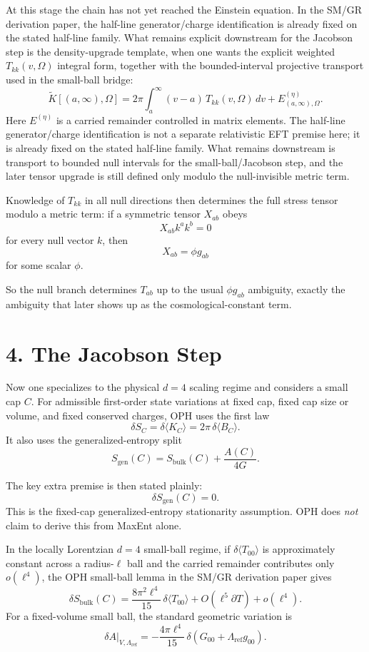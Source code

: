 \documentclass[10pt]{article}
\begin{document}
At this stage the chain has not yet reached the Einstein equation. In the SM/GR derivation paper, the half-line generator/charge identification is already fixed on the stated half-line family. What remains explicit downstream for the Jacobson step is the density-upgrade template, when one wants the explicit weighted \(T_{kk}(v,\Omega)\) integral form, together with the bounded-interval projective transport used in the small-ball bridge:
\[
\widetilde K[(a,\infty),\Omega]
=
2\pi\int_a^\infty (v-a)\,T_{kk}(v,\Omega)\,dv
+
E^{(\eta)}_{(a,\infty),\Omega}.
\]
Here \(E^{(\eta)}\) is a carried remainder controlled in matrix elements. The half-line generator/charge identification is not a separate relativistic EFT premise here; it is already fixed on the stated half-line family. What remains downstream is transport to bounded null intervals for the small-ball/Jacobson step, and the later tensor upgrade is still defined only modulo the null-invisible metric term.

Knowledge of \(T_{kk}\) in all null directions then determines the full stress tensor modulo a metric term: if a symmetric tensor \(X_{ab}\) obeys
\[
X_{ab} k^a k^b = 0
\]
for every null vector \(k\), then
\[
X_{ab} = \phi g_{ab}
\]
for some scalar \(\phi\).

So the null branch determines \(T_{ab}\) up to the usual \(\phi g_{ab}\) ambiguity, exactly the ambiguity that later shows up as the cosmological-constant term.

\section*{4. The Jacobson Step}

Now one specializes to the physical \(d=4\) scaling regime and considers a small cap \(C\). For admissible first-order state variations at fixed cap, fixed cap size or volume, and fixed conserved charges, OPH uses the first law
\[
\delta S_C = \delta \langle K_C\rangle = 2\pi\,\delta\langle B_C\rangle.
\]
It also uses the generalized-entropy split
\[
S_{\mathrm{gen}}(C)=S_{\mathrm{bulk}}(C)+\frac{A(C)}{4G}.
\]

The key extra premise is then stated plainly:
\[
\delta S_{\mathrm{gen}}(C)=0.
\]
This is the fixed-cap generalized-entropy stationarity assumption. OPH does \emph{not} claim to derive this from MaxEnt alone.

In the locally Lorentzian \(d=4\) small-ball regime, if \(\delta\langle T_{00}\rangle\) is approximately constant across a radius-\(\ell\) ball and the carried remainder contributes only \(o(\ell^4)\), the OPH small-ball lemma in the SM/GR derivation paper gives
\[
\delta S_{\mathrm{bulk}}(C)
=
\frac{8\pi^2 \ell^4}{15}\,\delta\langle T_{00}\rangle
+ O(\ell^5 \partial T)+o(\ell^4).
\]
For a fixed-volume small ball, the standard geometric variation is
\[
\delta A\big|_{V,\Lambda_{\mathrm{ref}}}
=
-\frac{4\pi \ell^4}{15}\,
\delta\!\left(G_{00}+\Lambda_{\mathrm{ref}} g_{00}\right).
\]
\end{document}
